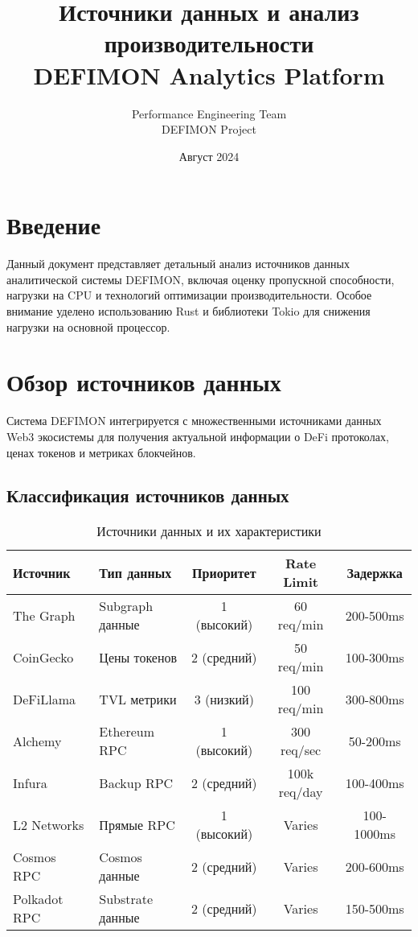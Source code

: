 \documentclass[11pt,a4paper]{article}
\title{Источники данных и анализ производительности\\DEFIMON Analytics Platform}
\author{Performance Engineering Team\\DEFIMON Project}
\date{Август 2024}
\begin{document}
\maketitle

\tableofcontents
\newpage

\section{Введение}

Данный документ представляет детальный анализ источников данных аналитической системы DEFIMON, включая оценку пропускной способности, нагрузки на CPU и технологий оптимизации производительности. Особое внимание уделено использованию Rust и библиотеки Tokio для снижения нагрузки на основной процессор.

\section{Обзор источников данных}

Система DEFIMON интегрируется с множественными источниками данных Web3 экосистемы для получения актуальной информации о DeFi протоколах, ценах токенов и метриках блокчейнов.

\subsection{Классификация источников данных}

\begin{table}[H]
\centering
\small
\begin{tabular}{|l|l|c|c|c|}
\hline
\textbf{Источник} & \textbf{Тип данных} & \textbf{Приоритет} & \textbf{Rate Limit} & \textbf{Задержка} \\
\hline
The Graph & Subgraph данные & 1 (высокий) & 60 req/min & 200-500ms \\
CoinGecko & Цены токенов & 2 (средний) & 50 req/min & 100-300ms \\
DeFiLlama & TVL метрики & 3 (низкий) & 100 req/min & 300-800ms \\
Alchemy & Ethereum RPC & 1 (высокий) & 300 req/sec & 50-200ms \\
Infura & Backup RPC & 2 (средний) & 100k req/day & 100-400ms \\
L2 Networks & Прямые RPC & 1 (высокий) & Varies & 100-1000ms \\
Cosmos RPC & Cosmos данные & 2 (средний) & Varies & 200-600ms \\
Polkadot RPC & Substrate данные & 2 (средний) & Varies & 150-500ms \\
\hline
\end{tabular}
\caption{Источники данных и их характеристики}
\end{table}
\end{document}
